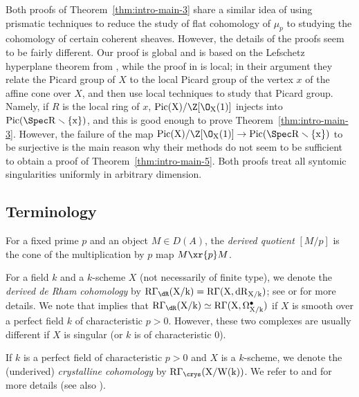 \documentclass[11pt,reqno]{amsart}
\numberwithin{equation}{section}
\theoremstyle{definition}
\begin{document}
Both proofs of Theorem~\ref{thm:intro-main-3} share a similar idea of using prismatic techniques to reduce the study of flat cohomology of $\mu_p$ to studying the cohomology of certain coherent sheaves. However, the details of the proofs seem to be fairly different. Our proof is global and is based on the Lefschetz hyperplane theorem from \cite{ABM}, while the proof in \cite{Ces-Scholze} is local; in their argument they relate the Picard group of $X$ to the local Picard group of the vertex $x$ of the affine cone over $X$, and then use local techniques to study that Picard group. Namely, if $R$ is the local ring of $x$, $\rm{Pic}(X)/\Z[\O_X(1)]$ injects into $\rm{Pic}(\Spec R \smallsetminus \{x\})$, and this is good enough to prove Theorem~\ref{thm:intro-main-3}. However, the failure of the map $\rm{Pic}(X)/\Z[\O_X(1)] \to \rm{Pic}(\Spec R \smallsetminus \{x\})$ to be surjective is the main reason why their methods do not seem to be sufficient to obtain a proof of Theorem~\ref{thm:intro-main-5}. Both proofs treat all syntomic singularities uniformly in arbitrary dimension. 




\subsection{Terminology}\label{section:terminology}  For a fixed prime $p$ and an object $M\in D(A)$, the {\it derived quotient} $[M/p]$ is the cone of the multiplication by $p$ map $M \xr{p} M$. \smallskip

For a field $k$ and a $k$-scheme $X$ (not necessarily of finite type), we denote the {\it derived de Rham cohomology} by $\rm{R}\Gamma_{\dR}(X/k)=\rm{R}\Gamma(X, \rm{dR}_{X/k})$; see \cite[\textsection VIII.2]{Illusie-cotangent} or \cite[]{bhatt-p-adic} for more details. We note that \cite[Corollary 3.10]{bhatt-p-adic} implies that $\rm{R}\Gamma_{\dR}(X/k) \simeq \rm{R}\Gamma(X, \Omega^\bullet_{X/k})$ if $X$ is smooth over a perfect field $k$ of characteristic $p>0$. However, these two complexes are usually different if $X$ is singular (or $k$ is of characteristic $0$). \smallskip

If $k$ is a perfect field of characteristic $p>0$ and $X$ is a $k$-scheme, we denote the (underived) {\it crystalline cohomology} by $\rm{R}\Gamma_\crys(X/W(k))$. We refer to \cite[]{BO} and \cite[\href{https://stacks.math.columbia.edu/tag/07GI}{Tag 07GI}]{stacks-project} for more details (see also \cite[Construction F.2]{Bhatt-Lurie}). \smallskip 
\end{document}
